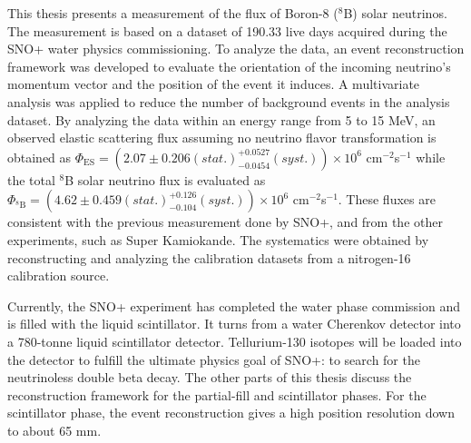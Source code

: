 \begin{doublespacing}
This thesis presents a measurement of the flux of Boron-8 ($^8$B) solar neutrinos. The measurement is based on a dataset of 190.33 live days acquired during the SNO+ water physics commissioning. To analyze the data, an event reconstruction framework was developed to evaluate the orientation of the incoming neutrino's momentum vector and the position of the event it induces. A multivariate analysis was applied to reduce the number of background events in the analysis dataset. By analyzing the data within an energy range from 5 to 15 MeV, an observed elastic scattering flux assuming no neutrino flavor transformation is obtained as $\Phi_{\mathrm{ES}}=(2.07 \pm 0.206 (stat.)^{+0.0527}_{-0.0454}(syst.))\times10^6$ cm$^{-2}$s$^{-1}$ while the total $^8$B solar neutrino flux is evaluated as $\Phi_{\mathrm{^8B}}=(4.62 \pm 0.459 (stat.)^{+0.126}_{-0.104}(syst.))\times10^6$ cm$^{-2}$s$^{-1}$. These fluxes are consistent with the previous measurement done by SNO+\cite{anderson2019measurement}, and from the other experiments, such as Super Kamiokande\cite{abe2016solar}. The systematics were obtained by reconstructing and analyzing the calibration datasets from a nitrogen-16 calibration source.

Currently, the SNO+ experiment has completed the water phase commission and is filled with the liquid scintillator. It turns from a water Cherenkov detector into a 780-tonne liquid scintillator detector. Tellurium-130 isotopes will be loaded into the detector to fulfill the ultimate physics goal of SNO+: to search for the neutrinoless double beta decay. The other parts of this thesis discuss the reconstruction framework for the partial-fill and scintillator phases. For the scintillator phase, the event reconstruction gives a high position resolution down to about 65 mm. %

\end{doublespacing}